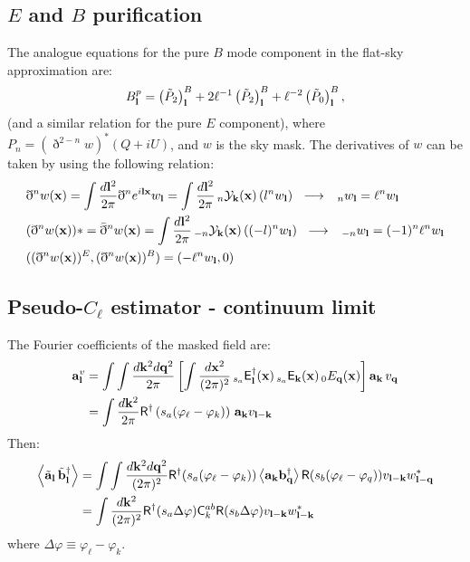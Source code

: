 \documentclass[a4paper,10pt]{article}
\begin{document}
  \subsection{$E$ and $B$ purification}
    The analogue equations for the pure $B$ mode component in the flat-sky approximation are:
    \begin{equation}
      B^p_{\bf l}=\left(\tilde{P}_2\right)^B_{\bf l}+2\ell^{-1}\left(\tilde{P}_2\right)^B_{\bf l}+\ell^{-2}\left(\tilde{P}_0\right)^B_{\bf l},
    \end{equation}
    (and a similar relation for the pure $E$ component), where $P_n=(\eth^{2-n}w)^*(Q+iU)$, and $w$ is the sky mask. The derivatives of $w$
    can be taken by using the following relation:
    \begin{align}
      &\eth^nw({\bf x})=\int\frac{d{\bf l}^2}{2\pi}\eth^ne^{i{\bf l}{\bf x}}w_{\bf l}=\int\frac{d{\bf l}^2}{2\pi}\,_n{\cal Y}_{\bf k}({\bf x})\,(l^nw_{\bf l})\hspace{6pt}
      \longrightarrow\hspace{6pt}\,_nw_{\bf l}=\ell^nw_{\bf l}\\
      &(\eth^nw({\bf x}))*=\bar{\eth}^nw({\bf x})=\int\frac{d{\bf l}^2}{2\pi}\,_{-n}{\cal Y}_{\bf k}({\bf x})\,((-l)^nw_{\bf l})\hspace{6pt}
      \longrightarrow\hspace{6pt}\,_{-n}w_{\bf l}=(-1)^n\ell^nw_{\bf l}\\
      &((\eth^nw({\bf x}))^E,(\eth^nw({\bf x}))^B)=(-\ell^nw_{\bf l},0)
    \end{align}



  \subsection{Pseudo-$C_\ell$ estimator - continuum limit}
    The Fourier coefficients of the masked field are:
    \begin{align}
      {\bf a}^v_{\bf l}&=\int\int\frac{d{\bf k}^2d{\bf q}^2}{2\pi}\left[\int\frac{d{\bf x}^2}{(2\pi)^2}\,_{s_a}{\sf E}^\dag_{\bf l}({\bf x})\,_{s_a}{\sf E}_{\bf k}({\bf x})\,_0E_{\bf q}({\bf x})\right]{\bf a}_{\bf k}\,v_{\bf q}\\
                       &=\int\frac{d{\bf k}^2}{2\pi}{\sf R}^\dag\left(s_a(\varphi_\ell-\varphi_k)\right)\,{\bf a}_{\bf k}v_{{\bf l}-{\bf k}}
    \end{align}
    Then:
    \begin{align}
      \left\langle\tilde{\bf a}_{\bf l}\,\tilde{\bf b}^\dag_{\bf l}\right\rangle
      &=\int\int\frac{d{\bf k}^2d{\bf q}^2}{(2\pi)^2}{\sf R}^\dag(s_a(\varphi_\ell-\varphi_k))\left\langle{\bf a}_{\bf k}{\bf b}^\dag_{\bf q}\right\rangle{\sf R}(s_b(\varphi_\ell-\varphi_q))v_{{\bf l}-{\bf k}}w^*_{{\bf l}-{\bf q}}\\
      &=\int\frac{d{\bf k}^2}{(2\pi)^2}{\sf R}^\dag(s_a\Delta\varphi){\sf C}^{ab}_k{\sf R}(s_b\Delta\varphi)v_{{\bf l}-{\bf k}}w^*_{{\bf l}-{\bf k}}
    \end{align}
    where $\Delta\varphi\equiv\varphi_\ell-\varphi_k$.
    
\end{document}
